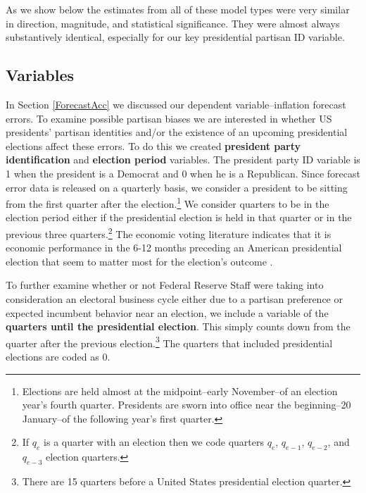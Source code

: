 \documentclass[a4paper]{article}\usepackage[]{graphicx}\usepackage[]{color}
\begin{document}
As we show below the estimates from all of these model types were very similar in direction, magnitude, and statistical significance. They were almost always substantively identical, especially for our key presidential partisan ID variable. 

\subsection{Variables}

In Section \ref{ForecastAcc} we discussed our dependent variable--inflation forecast errors. To examine possible partisan biases we are interested in whether US presidents' partisan identities and/or the existence of an upcoming presidential elections affect these errors. To do this we created {\bf{president party identification}} and {\bf{election period}} variables. The president party ID variable is 1 when the president is a Democrat and 0 when he is a Republican. Since forecast error data is released on a quarterly basis, we consider a president to be sitting from the first quarter after the election.\footnote{Elections are held almost at the midpoint--early November--of an election year's fourth quarter. Presidents are sworn into office near the beginning--20 January--of the following year's first quarter.} We consider quarters to be in the election period either if the presidential election is held in that quarter or in the previous three quarters.\footnote{If $q_{e}$ is a quarter with an election then we code quarters $q_{e}$, $q_{e-1}$, $q_{e-2}$, and $q_{e-3}$ election quarters.} The economic voting literature indicates that it is economic performance in the 6-12 months preceding an American presidential election that seem to matter most for the election's outcome \citep[c.f][]{Gelman1993}. 

To further examine whether or not Federal Reserve Staff were taking into consideration an electoral business cycle either due to a partisan preference or expected incumbent behavior near an election, we include a variable of the {\bf{quarters until the presidential election}}. This simply counts down from the quarter after the previous election.\footnote{There are 15 quarters before a United States presidential election quarter.} The quarters that included presidential elections are coded as 0. 
\end{document}
